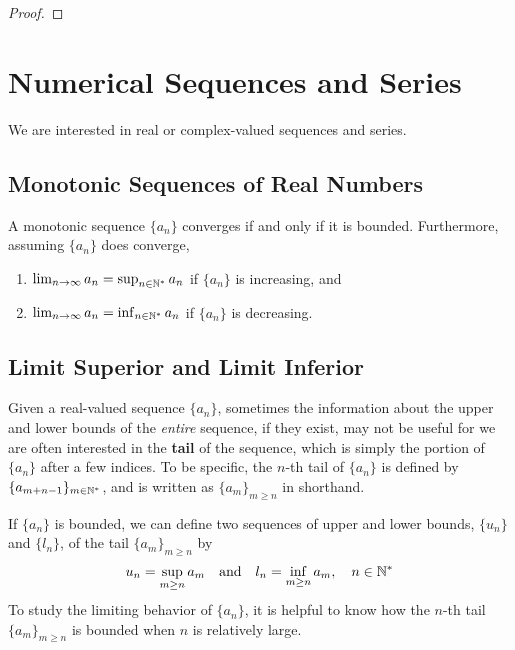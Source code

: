 \documentclass[thmcnt=section, 12pt]{my-elegantbook}
\begin{document}
\begin{proof}
\end{proof}



\chapter{Numerical Sequences and Series}

We are interested in real or complex-valued sequences and series.


\section{Monotonic Sequences of Real Numbers}

\begin{theorem} \label{thm:57}
    A monotonic sequence $\{a_n\}$ converges if and only if it is bounded. Furthermore, assuming $\{a_n\}$ does converge, 
    \begin{enumerate}
        \item $\lim_{n \to \infty} a_n = \sup_{n \in \mathbb{N}^\ast} a_n$ if $\{a_n\}$ is increasing, and
        \item $\lim_{n \to \infty} a_n = \inf_{n \in \mathbb{N}^\ast} a_n$ if $\{a_n\}$ is decreasing.
    \end{enumerate}
\end{theorem}


\section{Limit Superior and Limit Inferior}

Given a real-valued sequence $\{a_n\}$, sometimes the information about the upper and lower bounds of the \textit{entire} sequence, if they exist, may not be useful for we are often interested in the \textbf{tail} of the sequence, which is simply the portion of $\{a_n\}$ after a few indices. To be  specific, the $n$-th tail of $\{a_n\}$ is defined by $\{a_{m+n-1}\}_{m \in \mathbb{N}^\ast}$, and is written as $\{a_m\}_{m \geq n}$ in shorthand.

If $\{a_n\}$ is bounded, we can define two sequences of upper and lower bounds, $\{u_n\}$ and $\{l_n\}$, of the tail $\{a_m\}_{m \geq n}$ by
\begin{align*}
    u_n = \sup_{m \geq n} a_m
    \quad \text{and} \quad
    l_n = \inf_{m \geq n} a_m,
    \quad n \in \mathbb{N}^\ast
\end{align*}
To study the limiting behavior of $\{a_n\}$, it is helpful to know how the $n$-th tail $\{a_m\}_{m \geq n}$ is bounded when $n$ is relatively large.
\end{document}
